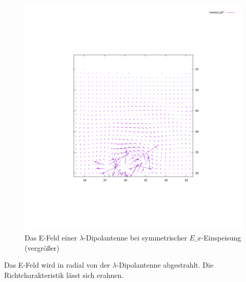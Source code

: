 \documentclass[11pt, ngerman]{article}
\begin{document}
\begin{figure}[H]
\includegraphics[width=\textwidth]{./lambda_dipol_ex_source_xyplane_efield_2.png}
	\caption{Das E-Feld einer \(\lambda\)-Dipolantenne bei symmetrischer \(E\_x\)-Einspeisung (vergr\"o{\ss}er)}
\end{figure}
\noindent Das E-Feld wird in radial von der \(\lambda\)-Dipolantenne abgestrahlt. Die Richtcharakteristik l\"asst sich erahnen.
\end{document}
